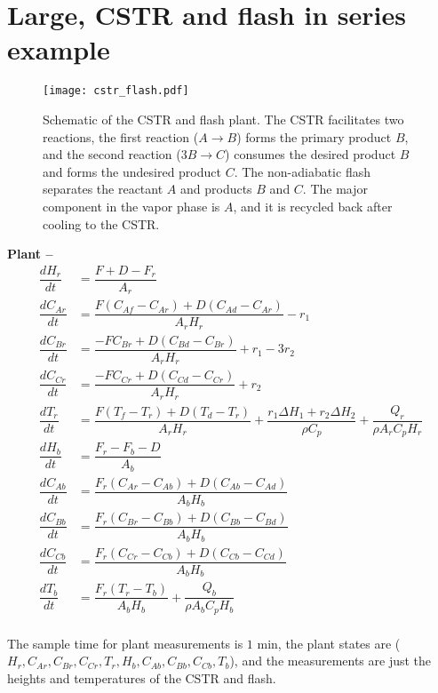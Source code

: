 \documentclass{article}
\begin{document}
\section{Large, CSTR and flash in series example}
\begin{figure}[!h]
  \centering
  \texttt{[image: cstr\_flash.pdf]}
  \caption{Schematic of the CSTR and flash plant. The CSTR facilitates two 
  reactions, the first reaction ($A \rightarrow B$) forms the primary product $B$, and the second reaction ($3B \rightarrow C$) 
  consumes the desired product $B$ and forms the undesired product $C$.
  The non-adiabatic flash separates the reactant $A$ and 
  products $B$ and $C$. The major component in the vapor phase 
  is $A$, and it is recycled back after cooling to the CSTR.}
  \label{fig:cstr_flash}
\end{figure}
\newpage
\textbf{Plant -- }
\begin{align*}
  \dfrac{dH_r}{dt} &= \dfrac{F + D -F_r}{A_r}\\
  \dfrac{dC_{Ar}}{dt} &= \dfrac{F(C_{Af} -C_{Ar}) + 
                         D(C_{Ad} -C_{Ar})}{A_rH_r} - r_1 \\
  \dfrac{dC_{Br}}{dt} &= \dfrac{-FC_{Br} + 
                          D(C_{Bd} -C_{Br})}{A_rH_r} + r_1 -3r_2\\
  \dfrac{dC_{Cr}}{dt} &= \dfrac{-FC_{Cr} + 
  D(C_{Cd} -C_{Cr})}{A_rH_r} + r_2\\
  \dfrac{dT_r}{dt} &= \dfrac{F(T_f - T_r) + D(T_d -T_r)}{A_rH_r} + 
                      \dfrac{r_1\Delta H_1 + r_2\Delta H_2}{\rho C_p} + 
                      \dfrac{Q_r}{\rho A_r C_p H_r}\\
  \dfrac{dH_b}{dt} &= \dfrac{F_r - F_b - D}{A_b} \\
  \dfrac{dC_{Ab}}{dt} &= \dfrac{F_r(C_{Ar} -C_{Ab}) + 
                          D(C_{Ab} -C_{Ad})}{A_bH_b} \\
  \dfrac{dC_{Bb}}{dt} &= \dfrac{F_r(C_{Br} -C_{Bb}) + 
                          D(C_{Bb} -C_{Bd})}{A_bH_b} \\
  \dfrac{dC_{Cb}}{dt} &= \dfrac{F_r(C_{Cr} -C_{Cb}) + 
                          D(C_{Cb} -C_{Cd})}{A_bH_b} \\
  \dfrac{dT_b}{dt} &= \dfrac{F_r(T_r - T_b)}{A_bH_b} +
                      \dfrac{Q_b}{\rho A_b C_p H_b}\\
\end{align*}

The sample time for plant measurements is $1$ min, the 
plant states are ($H_r, C_{Ar}, C_{Br}, C_{Cr}, T_r, 
H_b, C_{Ab}, C_{Bb}, C_{Cb}, T_b$), and the measurements are just 
the heights and temperatures of the CSTR and flash. \\
\end{document}
